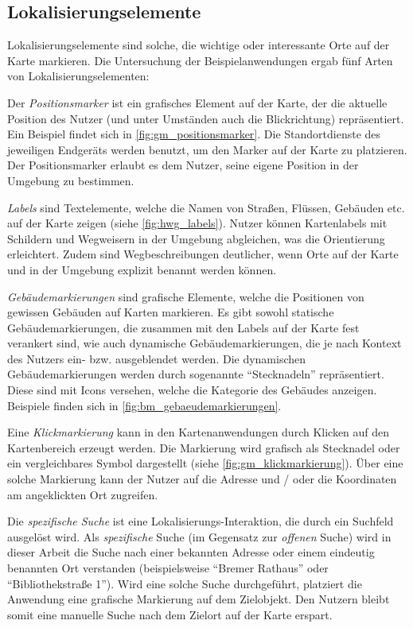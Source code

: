 \subsection{Lokalisierungselemente}
\label{ssec:loc-elements}
Lokalisierungselemente sind solche, die wichtige oder interessante Orte auf der Karte markieren.
Die Untersuchung der Beispielanwendungen ergab fünf Arten von Lokalisierungselementen:

Der \emph{Positionsmarker} ist ein grafisches Element auf der Karte, der die aktuelle Position des Nutzer (und unter Umständen auch die Blickrichtung) repräsentiert.
Ein Beispiel findet sich in \autoref{fig:gm_positionsmarker}.
Die Standortdienste des jeweiligen Endgeräts werden benutzt, um den Marker auf der Karte zu platzieren.
Der Positionsmarker erlaubt es dem Nutzer, seine eigene Position in der Umgebung zu bestimmen.

\emph{Labels} sind Textelemente, welche die Namen von Straßen, Flüssen, Gebäuden etc. auf der Karte zeigen (siehe \autoref{fig:hwg_labels}).
Nutzer können Kartenlabels mit Schildern und Wegweisern in der Umgebung abgleichen, was die Orientierung erleichtert.
Zudem sind Wegbeschreibungen deutlicher, wenn Orte auf der Karte und in der Umgebung explizit benannt werden können.

\emph{Gebäudemarkierungen} sind grafische Elemente, welche die Positionen von gewissen Gebäuden auf Karten markieren.
Es gibt sowohl statische Gebäudemarkierungen, die zusammen mit den Labels auf der Karte fest verankert sind, wie auch dynamische Gebäudemarkierungen, die je nach Kontext des Nutzers ein- bzw. ausgeblendet werden.
Die dynamischen Gebäudemarkierungen werden durch sogenannte \enquote{Stecknadeln} repräsentiert.
Diese sind mit Icons versehen, welche die Kategorie des Gebäudes anzeigen.
Beispiele finden sich in \autoref{fig:bm_gebaeudemarkierungen}.

Eine \emph{Klickmarkierung} kann in den Kartenanwendungen durch Klicken auf den Kartenbereich erzeugt werden.
Die Markierung wird grafisch als Stecknadel oder ein vergleichbares Symbol dargestellt (siehe \autoref{fig:gm_klickmarkierung}).
Über eine solche Markierung kann der Nutzer auf die Adresse und / oder die Koordinaten am angeklickten Ort zugreifen.

Die \emph{spezifische Suche} ist eine Lokalisierungs-Interaktion, die durch ein Suchfeld ausgelöst wird.
Als \emph{spezifische} Suche (im Gegensatz zur \emph{offenen} Suche) wird in dieser Arbeit die Suche nach einer bekannten Adresse oder einem eindeutig benannten Ort verstanden (beispielsweise \enquote{Bremer Rathaus} oder \enquote{Bibliothekstraße 1}).
Wird eine solche Suche durchgeführt, platziert die Anwendung eine grafische Markierung auf dem Zielobjekt.
Den Nutzern bleibt somit eine manuelle Suche nach dem Zielort auf der Karte erspart.

